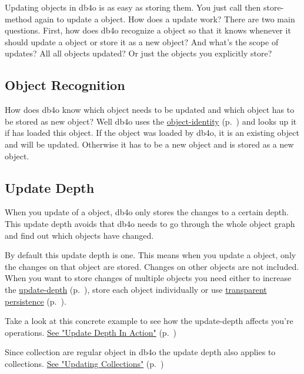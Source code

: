 Updating objects in db4o is as easy as storing them. You just call then store-method again to update a object. How does a update work? There are two main questions. First, how does db4o recognize a object so that it knows whenever it should update a object or store it as a new object? And what's the scope of updates? All all objects updated? Or just the objects you explicitly store?

\subsection*{Object Recognition}

How does db4o know which object needs to be updated and which object has to be stored as new object? Well db4o uses the \hyperref[ref:basics-identity-concept]{object-identity} (p.~\pageref{ref:basics-identity-concept}) and looks up it if has loaded this object. If the object was loaded by db4o, it is an existing object and will be updated. Otherwise it has to be a new object and is stored as a new object.

\subsection*{Update Depth}

When you update of a object, db4o only stores the changes to a certain depth. This update depth avoids that db4o needs to go through the whole object graph and find out which objects have changed.

By default this update depth is one. This means when you update a object, only the changes on that object are stored. Changes on other objects are not included. When you want to store changes of multiple objects you need either to increase the \hyperref[ref:configuration-common-update-depth]{update-depth} (p.~\pageref{ref:configuration-common-update-depth}), store each object individually or use \hyperref[ref:basics-update-concept-transparent-persistence]{transparent persistence} (p.~\pageref{ref:basics-update-concept-transparent-persistence}).

Take a look at this concrete example to see how the update-depth affects you're operations. \hyperref[ref:basics-update-concept-update-depth-in-action]{See "Update Depth In Action"} (p.~\pageref{ref:basics-update-concept-update-depth-in-action})

Since collection are regular object in db4o the update depth also applies to collections. \hyperref[ref:basics-update-concept-updating-collections]{See "Updating Collections"} (p.~\pageref{ref:basics-update-concept-updating-collections})

